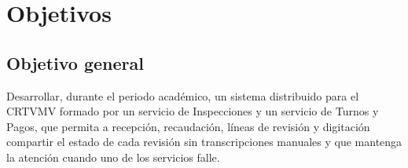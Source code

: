 \documentclass[11pt,a4paper]{article}
\begin{document}
	\section{Objetivos}
	
	\subsection{Objetivo general}
	Desarrollar, durante el periodo académico, un sistema distribuido para el CRTVMV formado por un servicio de Inspecciones y un servicio de Turnos y Pagos, que permita a recepción, recaudación, líneas de revisión y digitación compartir el estado de cada revisión sin transcripciones manuales y que mantenga la atención cuando uno de los servicios falle.
	
\end{document}
